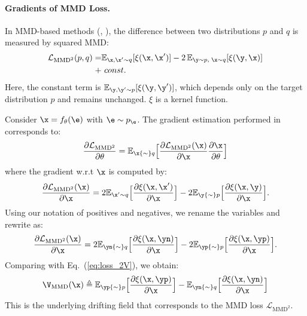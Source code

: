 \paragraph{Gradients of MMD Loss.}
\newcommand{\kk}{\xi}
\newcommand{\LMMD}{\mathcal{L}_{\text{MMD}^2}}
In MMD-based methods (\eg, \citealt{li2015generative}), the difference between two distributions $p$ and $q$ is measured by squared MMD:
\begin{equation}
\label{eq:mmd2_def}
\begin{aligned}
\LMMD(p,q)
= &
\mathbb{E}_{\x,\x'\sim q}[\kk(\x,\x')]
-2\,\mathbb{E}_{\y\sim p,\;\x\sim q}[\kk(\y,\x)]
\\
+ &~const.
\end{aligned}
\end{equation}
Here, the constant term is $\mathbb{E}_{\y,\y'\sim p}[\kk(\y,\y')]$, which depends only on the target distribution $p$ and remains unchanged. $\kk$ is a kernel function. 

Consider $\x=f_\theta(\e)$ with $\e\sim p_\e$. The gradient estimation performed in \cite{li2015generative} corresponds to:
\begin{equation}
\frac{\partial\LMMD}{\partial {\theta}} =
\mathbb{E}_{\x{\sim}q}\Big[\frac{\partial\LMMD(\x)}{\partial {\x}} \frac{\partial\x}{\partial\theta}
\Big]
\end{equation}
where the gradient w.r.t $\x$ is computed by:
\begin{equation}
\frac{\partial\LMMD(\x)}{\partial {\x}}
=
2\mathbb{E}_{\x'{\sim}q} \Big[\frac{\partial \kk(\x,\x')}{\partial{\x}}\Big]
-
2\mathbb{E}_{\y{\sim}p} \Big[\frac{\partial \kk(\x,\y)}{\partial{\x}}\Big].
\end{equation}
Using our notation of positives and negatives, we rename the variables and rewrite as:
\begin{equation}
\label{eq:mmd_eq4}
\frac{\partial\mathcal L_{\text{MMD}^2}(\x)}{\partial {\x}}
=
2\mathbb{E}_{\yn{\sim}q} \Big[\frac{\partial \kk(\x,\yn)}{\partial{\x}}\Big]
-
2\mathbb{E}_{\yp{\sim}p} \Big[\frac{\partial \kk(\x,\yp)}{\partial{\x}}\Big].
\end{equation}
Comparing with Eq.~(\ref{eq:loss_2V}), we obtain:
\begin{equation}
\label{eq:mmd_Vmmd}
\V_\text{MMD}(\x)
\triangleq
\mathbb{E}_{\yp{\sim}p} \Big[\frac{\partial \kk(\x,\yp)}{\partial{\x}}\Big]
-
\mathbb{E}_{\yn{\sim}q} \Big[\frac{\partial \kk(\x,\yn)}{\partial{\x}}\Big]
\end{equation}
This is the underlying drifting field that corresponds to the MMD loss $\LMMD$.




